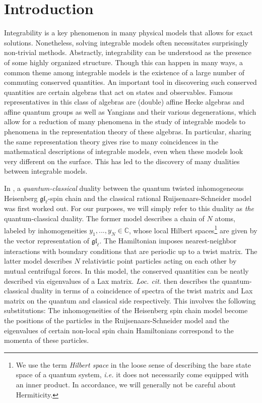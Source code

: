 \documentclass[11pt]{report}
\theoremstyle{definition}
\theoremstyle{remark}
\theoremstyle{remark}
\newcommand{\C}{\mathbb{C}}
\begin{document}
\setcounter{chapter}{-1}
\chapter{Introduction}

Integrability \cite{book:arutyunov:elements} is a key phenomenon in many physical models that allows for exact solutions. Nonetheless, solving integrable models often necessitates surprisingly non-trivial methods. Abstractly, integrability can be understood as the presence of some highly organized structure. Though this can happen in many ways, a common theme among integrable models is the existence of a large number of commuting conserved quantities. An important tool in discovering such conserved quantities are certain algebras that act on states and observables. Famous representatives in this class of algebras are (double) affine Hecke algebras and affine quantum groups as well as Yangians and their various degenerations, which allow for a reduction of many phenomena in the study of integrable models to phenomena in the representation theory of these algebras. In particular, sharing the same representation theory gives rise to many coincidences in the mathematical descriptions of integrable models, even when these models look very different on the surface. This has led to the discovery of many dualities between integrable models.

In \cite{article:gorsky:2014}, a \emph{quantum-classical} duality between the quantum twisted inhomogeneous Heisenberg $\mathfrak{gl}_\ell$-spin chain and the classical rational Ruijsenaars-Schneider model was first worked out. For our purposes, we will simply refer to this duality as \emph{the} quantum-classical duality. The former model describes a chain of $N$ atoms, labeled by inhomogeneities $y_1,...,y_N \in \C$, whose local Hilbert spaces\footnote{We use the term \emph{Hilbert space} in the loose sense of describing the bare state space of a quantum system, \emph{i.e.} it does not necessarily come equipped with an inner product. In accordance, we will generally not be careful about Hermiticity.} are given by the vector representation of $\mathfrak{gl}_\ell$. The Hamiltonian imposes nearest-neighbor interactions with boundary conditions that are periodic up to a twist matrix. The latter model describes $N$ relativistic point particles acting on each other by mutual centrifugal forces. In this model, the conserved quantities can be neatly described via eigenvalues of a Lax matrix. \emph{Loc. cit.} then describes the quantum-classical duality in terms of a coincidence of spectra of the twist matrix and Lax matrix on the quantum and classical side respectively. This involves the following substitutions: The inhomogeneities of the Heisenberg spin chain model become the positions of the particles in the Ruijsenaars-Schneider model and the eigenvalues of certain non-local spin chain Hamiltonians correspond to the momenta of these particles.
\end{document}
